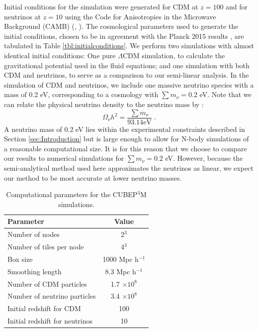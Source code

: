 \documentclass{aastex}
\begin{document}
Initial conditions for the simulation were generated for CDM 
at $z=100$ and for neutrinos at $z=10$ using the Code for
Anisotropies in the Microwave Background (CAMB) (\cite{lewis99}, 
\cite{lewis13}). The cosmological parameters used to generate the initial
conditions, chosen to be in agreement with the Planck 2015 results \citep{planck15}, are tabulated in Table
\ref{tbl:initialconditions}.  
We perform two simulations with almost identical
initial conditions: One pure $\Lambda$CDM simulation, to calculate
the gravitational potential used in the fluid equations; and one
simulation with both CDM and neutrinos, to serve as a
comparison to our semi-linear analysis.  In the simulation of CDM
 and neutrinos, we include one massive neutrino
species with a mass of 0.2 eV, corresponding to a cosmology with $\sum
m_\nu = 0.2$ eV.  
Note that we can relate
the physical neutrino density to the neutrino mass by
\citep{Mangano05}:
\begin{equation}
  \Omega_\nu h^2 = \frac{ \sum m_\nu }{ 93.14 \text{eV}} \;.
\end{equation}
A neutrino mass of 0.2 eV lies within the experimental constraints described in
Section \ref{sec:Introduction} but is large enough to allow for N-body
simulations of a reasonable computational size.  It is for this
reason that we choose to compare our results to numerical simulations for $\sum m_\nu =
0.2$ eV. However, because the semi-analytical method used here approximates the
neutrinos as linear, we expect our method to be most
accurate at lower neutrino masses.   

\begin{table}[h]
\caption{Computational parameters for the CUBEP$^{3}$M simulations. }\label{tbl:initialnconditions}
\begin{center}
\begin{tabular}{lc}
\toprule
Parameter & Value \\ \hline \hline
  Number of nodes & 2$^3$ \\
 Number of tiles per node & 4$^3$ \\
Box size & 1000 Mpc h$^{-1}$ \\
Smoothing length & 8.3 Mpc h$^{-1}$ \\
Number of CDM particles & 1.7 $\times 10^{8}$\\
Number of neutrino particles & 3.4 $\times 10^{8}$\\
 Initial redshift for CDM & 100 \\
Initial redshift for neutrinos & 10 \\\bottomrule
\end{tabular}
\end{center}
\end{table}
\end{document}
